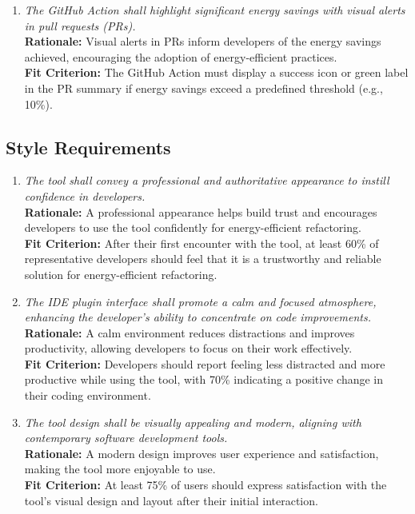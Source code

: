 \documentclass[12pt]{article}
\begin{document}
\begin{enumerate}[label=LFR-AP \arabic*., wide=0pt, leftmargin=*]
    {\bf Fit Criterion:} The tool must use colour-coded indicators (e.g., yellow for minor energy savings, red for major savings), allowing developers to identify refactoring opportunities quickly.
    \item \emph{The GitHub Action shall highlight significant energy savings with visual alerts in pull requests (PRs).}\\[2mm]
    {\bf Rationale:} Visual alerts in PRs inform developers of the energy savings achieved, encouraging the adoption of energy-efficient practices.\\
    {\bf Fit Criterion:} The GitHub Action must display a success icon or green label in the PR summary if energy savings exceed a predefined threshold (e.g., 10\%).
\end{enumerate}

\subsection{Style Requirements}
\begin{enumerate}[label=LFR-ST \arabic*., wide=0pt, leftmargin=*]
    \item \emph{The tool shall convey a professional and authoritative appearance to instill confidence in developers.}\\[2mm]
    {\bf Rationale:} A professional appearance helps build trust and encourages developers to use the tool confidently for energy-efficient refactoring.\\
    {\bf Fit Criterion:} After their first encounter with the tool, at least 60\% of representative developers should feel that it is a trustworthy and reliable solution for energy-efficient refactoring.
    \item \emph{The IDE plugin interface shall promote a calm and focused atmosphere, enhancing the developer's ability to concentrate on code improvements.}\\[2mm]
    {\bf Rationale:} A calm environment reduces distractions and improves productivity, allowing developers to focus on their work effectively.\\
    {\bf Fit Criterion:} Developers should report feeling less distracted and more productive while using the tool, with 70\% indicating a positive change in their coding environment.
    \item \emph{The tool design shall be visually appealing and modern, aligning with contemporary software development tools.}\\[2mm]
    {\bf Rationale:} A modern design improves user experience and satisfaction, making the tool more enjoyable to use.\\
    {\bf Fit Criterion:} At least 75\% of users should express satisfaction with the tool's visual design and layout after their initial interaction.
\end{enumerate}
\end{document}
